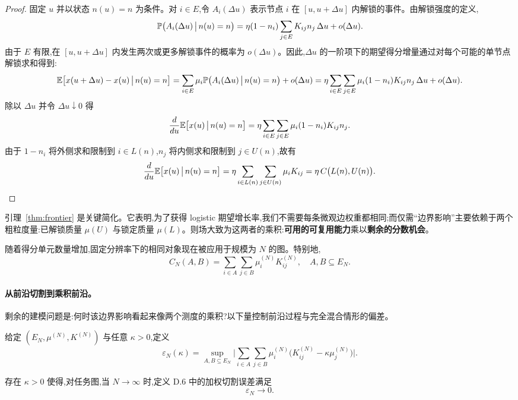 \begin{proof}
固定 $u$ 并以状态 $n(u) = n$ 为条件。对 $i \in E$,令 $A_{i}(\Delta u)$ 表示节点 $i$ 在 $[u, u + \Delta u]$ 内解锁的事件。由解锁强度的定义,
\[
    \mathbb{P}\bigl(A_{i}(\Delta u) \,\big|\, n(u) = n\bigr) = \eta (1 - n_{i}) \sum_{j \in E} K_{ij} n_{j}\, \Delta u + o(\Delta u).
\]
由于 $E$ 有限,在 $[u, u + \Delta u]$ 内发生两次或更多解锁事件的概率为 $o(\Delta u)$。因此,$\Delta u$ 的一阶项下的期望得分增量通过对每个可能的单节点解锁求和得到:
\[
    \mathbb{E}\bigl[x(u + \Delta u) - x(u) \,\big|\, n(u) = n\bigr]
    = \sum_{i \in E} \mu_{i} \mathbb{P}\bigl(A_{i}(\Delta u) \,\big|\, n(u) = n\bigr) + o(\Delta u)
    = \eta \sum_{i \in E} \sum_{j \in E} \mu_{i} (1 - n_{i}) K_{ij} n_{j}\, \Delta u + o(\Delta u).
\]
除以 $\Delta u$ 并令 $\Delta u \downarrow 0$ 得
\[
    \frac{d}{du} \mathbb{E}\bigl[x(u) \,\big|\, n(u) = n\bigr]
    = \eta \sum_{i \in E} \sum_{j \in E} \mu_{i} (1 - n_{i}) K_{ij} n_{j}.
\]
由于 $1 - n_{i}$ 将外侧求和限制到 $i \in L(n)$,$n_{j}$ 将内侧求和限制到 $j \in U(n)$,故有
\[
    \frac{d}{du} \mathbb{E}\bigl[x(u) \,\big|\, n(u) = n\bigr]
    = \eta \sum_{i \in L(n)} \sum_{j \in U(n)} \mu_{i} K_{ij}
    = \eta\, C\bigl(L(n), U(n)\bigr).
\]
\end{proof}

引理~\ref{thm:frontier} 是关键简化。它表明,为了获得 logistic 期望增长率,我们不需要每条微观边权重都相同;而仅需``边界影响''主要依赖于两个粗粒度量:已解锁质量 $\mu(U)$ 与锁定质量 $\mu(L)$。则场大致为这两者的乘积:\textbf{可用的可复用能力}乘以\textbf{剩余的分数机会}。

随着得分单元数量增加,固定分辨率下的相同对象现在被应用于规模为 $N$ 的图。特别地,
\[
    C_{N}(A, B) = \sum_{i \in A} \sum_{j \in B} \mu^{(N)}_{i} K^{(N)}_{ij}, \quad A, B \subseteq E_{N}.
\]

\paragraph{从前沿切割到乘积前沿。} 剩余的建模问题是:何时该边界影响看起来像两个测度的乘积?以下量控制前沿过程与完全混合情形的偏差。

\begin{definition}[单任务加权切割误差]
给定 $(E_{N}, \mu^{(N)}, K^{(N)})$ 与任意 $\kappa > 0$,定义
\[
    \varepsilon_{N}(\kappa) = \sup_{A, B \subseteq E_{N}} \biggl| \sum_{i \in A} \sum_{j \in B} \mu^{(N)}_{i} \bigl( K^{(N)}_{ij} - \kappa \mu^{(N)}_{j} \bigr) \biggr|.
\]
\end{definition}

\begin{condition}[单任务加权切割混合]
存在 $\kappa > 0$ 使得,对任务图,当 $N \to \infty$ 时,定义 D.6 中的加权切割误差满足
\[
    \varepsilon_{N} \to 0.
\]
\end{condition}


